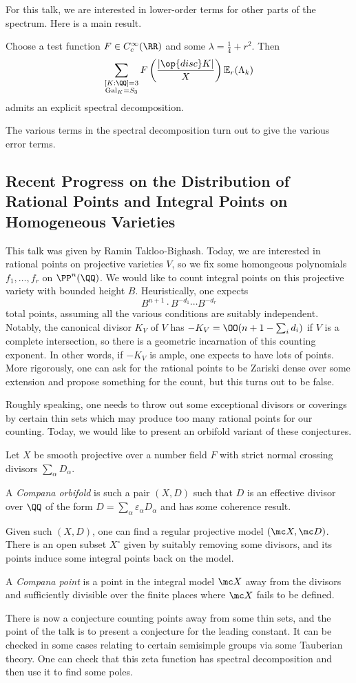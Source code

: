 \documentclass{article}
\begin{document}
For this talk, we are interested in lower-order terms for other parts of the spectrum. Here is a main result.
\begin{theorem}
	Choose a test function $F\in C_c^\infty(\RR)$ and some $\lambda=\frac14+r^2$. Then
	\[\sum_{\substack{[K:\QQ]=3\\\mathrm{Gal}_K=S_3}}F\left(\frac{\left|\op{disc}K\right|}X\right)\mathbb E_r(\Lambda_k)\]
	admits an explicit spectral decomposition.
\end{theorem}
The various terms in the spectral decomposition turn out to give the various error terms.

\subsection{Recent Progress on the Distribution of Rational Points and Integral Points on Homogeneous Varieties}
This talk was given by Ramin Takloo-Bighash. Today, we are interested in rational points on projective varieties $V$, so we fix some homongeous polynomials $f_1,\ldots,f_r$ on $\PP^n(\QQ)$. We would like to count integral points on this projective variety with bounded height $B$. Heuristically, one expects
\[B^{n+1}\cdot B^{-d_1}\cdots B^{-d_r}\]
total points, assuming all the various conditions are suitably independent. Notably, the canonical divisor $K_V$ of $V$ has $-K_V=\OO(n+1-\sum_id_i)$ if $V$ is a complete intersection, so there is a geometric incarnation of this counting exponent. In other words, if $-K_V$ is ample, one expects to have lots of points. More rigorously, one can ask for the rational points to be Zariski dense over some extension and propose something for the count, but this turns out to be false.

Roughly speaking, one needs to throw out some exceptional divisors or coverings by certain thin sets which may produce too many rational points for our counting. Today, we would like to present an orbifold variant of these conjectures.

Let $X$ be smooth projective over a number field $F$ with strict normal crossing divisors $\sum_\alpha D_\alpha$.
\begin{definition}
	A \textit{Compana orbifold} is such a pair $(X,D)$ such that $D$ is an effective divisor over $\QQ$ of the form $D=\sum_\alpha\varepsilon_\alpha D_\alpha$ and has some coherence result.
\end{definition}
Given such $(X,D)$, one can find a regular projective model $(\mc X,\mc D)$. There is an open subset $X^\circ$ given by suitably removing some divisors, and its points induce some integral points back on the model.
\begin{definition}
	A \textit{Compana point} is a point in the integral model $\mc X$ away from the divisors and sufficiently divisible over the finite places where $\mc X$ fails to be defined.
\end{definition}
There is now a conjecture counting points away from some thin sets, and the point of the talk is to present a conjecture for the leading constant. It can be checked in some cases relating to certain semisimple groups via some Tauberian theory. One can check that this zeta function has spectral decomposition and then use it to find some poles.
\end{document}
